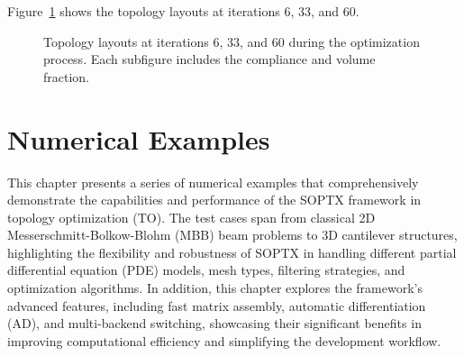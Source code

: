 \documentclass[mathpazo]{cicp}
\begin{document}
Figure~\ref{fig:canti_1_all} shows the topology layouts at iterations 6, 33, and 60.
\begin{figure}[htp]
	\centering
	\caption{Topology layouts at iterations 6, 33, and 60 during the optimization process. Each subfigure includes the compliance and volume fraction.}
	\label{fig:canti_1_all}
\end{figure}

\section{Numerical Examples}
This chapter presents a series of numerical examples that comprehensively demonstrate the capabilities and performance of the SOPTX framework in topology optimization (TO).  The test cases span from classical 2D Messerschmitt-Bolkow-Blohm (MBB) beam problems to 3D cantilever structures, highlighting the flexibility and robustness of SOPTX in handling different partial differential equation (PDE) models, mesh types, filtering strategies, and optimization algorithms. In addition, this chapter explores the framework’s advanced features, including fast matrix assembly, automatic differentiation (AD), and multi-backend switching, showcasing their significant benefits in improving computational efficiency and simplifying the development workflow.
\end{document}
